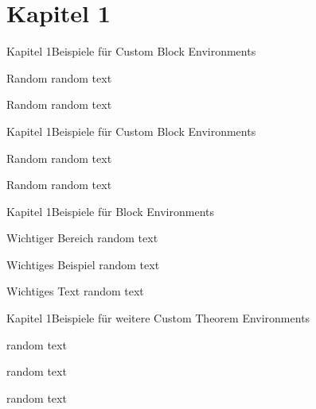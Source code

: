 

\if{}\section{Kapitel 1}\fi

\begin{frame}[label={kapitel1}]{Kapitel 1}{Beispiele für Custom Block Environments}
  \begin{custom}{Random}
    random text
  \end{custom}

  \begin{acustom}{Random}
    random text
  \end{acustom}
\end{frame}

\begin{frame}{Kapitel 1}{Beispiele für Custom Block Environments}
  \begin{custom}{Random}
    random text
  \end{custom}

  \begin{acustom}{Random}
    random text
  \end{acustom}
\end{frame}

\begin{frame}{Kapitel 1}{Beispiele für Block Environments}
  \begin{block}{Wichtiger Bereich}
    random text
  \end{block}

  \begin{exampleblock}{Wichtiges Beispiel}
    random text
  \end{exampleblock}

  \begin{alertblock}{Wichtiges Text}
    random text
  \end{alertblock}
\end{frame}

\begin{frame}{Kapitel 1}{Beispiele für weitere Custom Theorem Environments}
  \begin{customtheorem}
    random text
  \end{customtheorem}

  \begin{subcustomtheorem}
    random text
  \end{subcustomtheorem}

  \begin{ocustomtheorem}
    random text
  \end{ocustomtheorem}
\end{frame}

